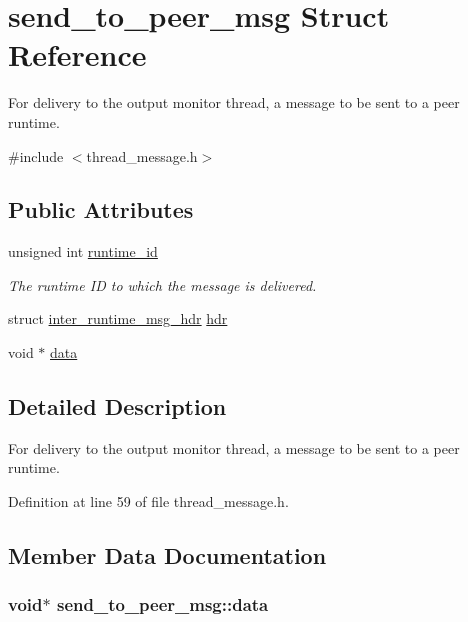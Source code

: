 \hypertarget{structsend__to__peer__msg}{\section{send\-\_\-to\-\_\-peer\-\_\-msg Struct Reference}
\label{structsend__to__peer__msg}
}


For delivery to the output monitor thread, a message to be sent to a peer runtime.  




{\ttfamily \#include $<$thread\-\_\-message.\-h$>$}

\subsection*{Public Attributes}
\begin{DoxyCompactItemize}
\item 
unsigned int \hyperlink{structsend__to__peer__msg_a291ea22d7a3784c77f7df0c78e06b84a}{runtime\-\_\-id}
\begin{DoxyCompactList}\small\item\em The runtime I\-D to which the message is delivered. \end{DoxyCompactList}\item 
struct \hyperlink{structinter__runtime__msg__hdr}{inter\-\_\-runtime\-\_\-msg\-\_\-hdr} \hyperlink{structsend__to__peer__msg_a5e233e774179fa4a3dbe2706c0c9955f}{hdr}
\item 
void $\ast$ \hyperlink{structsend__to__peer__msg_a2a6728008d8e4e13bcb78755b020974c}{data}
\end{DoxyCompactItemize}


\subsection{Detailed Description}
For delivery to the output monitor thread, a message to be sent to a peer runtime. 

Definition at line 59 of file thread\-\_\-message.\-h.



\subsection{Member Data Documentation}
\hypertarget{structsend__to__peer__msg_a2a6728008d8e4e13bcb78755b020974c}{
\subsubsection[{data}]{\setlength{\rightskip}{0pt plus 5cm}void$\ast$ send\-\_\-to\-\_\-peer\-\_\-msg\-::data}}\label{structsend__to__peer__msg_a2a6728008d8e4e13bcb78755b020974c}


